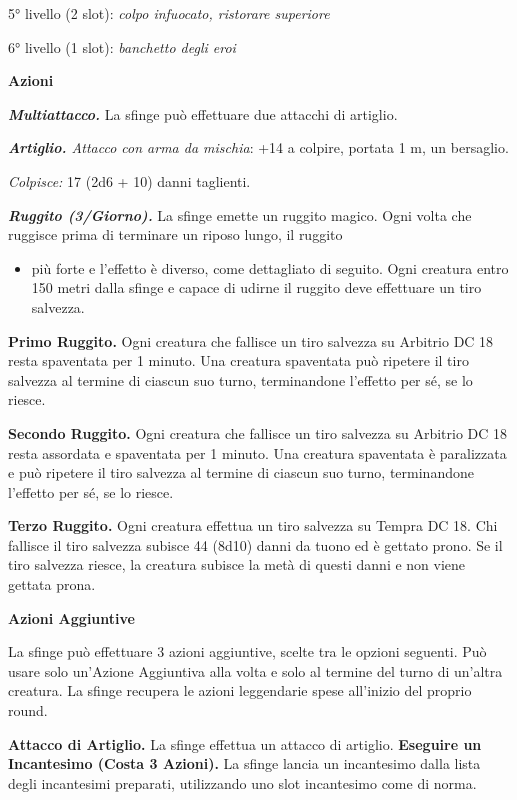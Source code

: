 \begin{multicols}{2}
5° livello (2 slot): \emph{colpo infuocato, ristorare superiore}

6° livello (1 slot): \emph{banchetto degli eroi}


\smallskip\textbf{Azioni}

\emph{\textbf{Multiattacco.}} La sfinge può effettuare due attacchi di
artiglio.

\emph{\textbf{Artiglio.} Attacco con arma da mischia}: +14 a colpire,
portata 1 m, un bersaglio.

\emph{Colpisce:} 17 (2d6 + 10) danni taglienti.

\emph{\textbf{Ruggito (3/Giorno).}} La sfinge emette un ruggito magico.
Ogni volta che ruggisce prima di terminare un riposo lungo, il ruggito


\begin{itemize}
\item
  più forte e l'effetto è diverso, come dettagliato di seguito. Ogni
  creatura entro 150 metri dalla sfinge e capace di udirne il ruggito
  deve effettuare un tiro salvezza.
\end{itemize}


\textbf{Primo Ruggito.} Ogni creatura che fallisce un tiro salvezza su Arbitrio DC 18 resta spaventata per 1 minuto. Una creatura spaventata
può ripetere il tiro salvezza al termine di ciascun suo turno,
terminandone l'effetto per sé, se lo riesce.

\textbf{Secondo Ruggito.} Ogni creatura che fallisce un tiro salvezza su Arbitrio DC 18 resta assordata e spaventata per 1 minuto. Una creatura
spaventata è paralizzata e può ripetere il tiro salvezza al termine di
ciascun suo turno, terminandone l'effetto per sé, se lo riesce.

\textbf{Terzo Ruggito.} Ogni creatura effettua un tiro salvezza su Tempra DC 18. Chi fallisce il tiro salvezza subisce 44 (8d10)
danni da tuono ed è gettato prono. Se il tiro salvezza riesce, la
creatura subisce la metà di questi danni e non viene gettata prona.

\textbf{Azioni Aggiuntive}

La sfinge può effettuare 3 azioni aggiuntive, scelte tra le opzioni
seguenti. Può usare solo un'Azione Aggiuntiva alla volta e solo al
termine del turno di un'altra creatura. La sfinge recupera le azioni
leggendarie spese all'inizio del proprio round.

\textbf{Attacco di Artiglio.} La sfinge effettua un attacco di artiglio.
\textbf{Eseguire un Incantesimo (Costa 3 Azioni).} La sfinge lancia un
incantesimo dalla lista degli incantesimi preparati, utilizzando uno
slot incantesimo come di norma.


\end{multicols}
